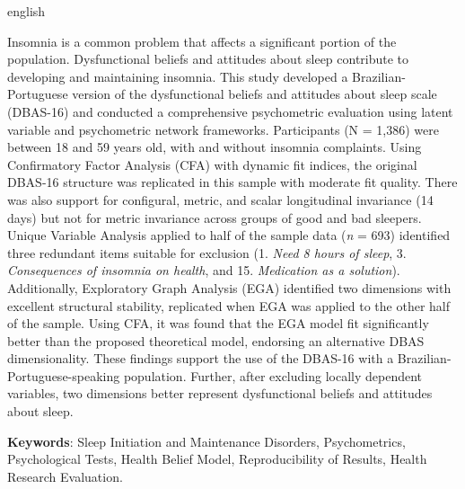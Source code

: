 \documentclass[
  12pt,
  twoside,
  openright,
  a4paper,
  chapter=TITLE,
  section=TITLE,
  brazil]{abntex2}
\newcommand{\listofquadrosname}{Lista de Quadros}
\renewcommand*\listfigurename{LISTA DE FIGURAS}
\newcommand\listfigurename{LISTA DE FIGURAS}
\begin{document}
\begin{resumo}[Abstract]
  \begin{otherlanguage*}{english}
  
    Insomnia is a common problem that affects a significant portion of the population. Dysfunctional beliefs and attitudes about sleep contribute to developing and maintaining insomnia. This study developed a Brazilian-Portuguese version of the dysfunctional beliefs and attitudes about sleep scale (DBAS-16) and conducted a comprehensive psychometric evaluation using latent variable and psychometric network frameworks. Participants (N = 1,386) were between 18 and 59 years old, with and without insomnia complaints. Using Confirmatory Factor Analysis (CFA) with dynamic fit indices, the original DBAS-16 structure was replicated in this sample with moderate fit quality. There was also support for configural, metric, and scalar longitudinal invariance (14 days) but not for metric invariance across groups of good and bad sleepers. Unique Variable Analysis applied to half of the sample data (\emph{n} = 693) identified three redundant items suitable for exclusion (1. \emph{Need 8 hours of sleep}, 3. \emph{Consequences of insomnia on health}, and 15. \emph{Medication as a solution}). Additionally, Exploratory Graph Analysis (EGA) identified two dimensions with excellent structural stability, replicated when EGA was applied to the other half of the sample. Using CFA, it was found that the EGA model fit significantly better than the proposed theoretical model, endorsing an alternative DBAS dimensionality. These findings support the use of the DBAS-16 with a Brazilian-Portuguese-speaking population. Further, after excluding locally dependent variables, two dimensions better represent dysfunctional beliefs and attitudes about sleep.

    \vspace{\onelineskip}
 
    \noindent 
    \textbf{Keywords}: Sleep Initiation and Maintenance Disorders, Psychometrics, Psychological Tests, Health Belief Model, Reproducibility of Results, Health Research Evaluation.
  \end{otherlanguage*}
\end{resumo}

\pdfbookmark[0]{\listfigurename}{lof}
\listoffigures*
\cleardoublepage

\end{document}
